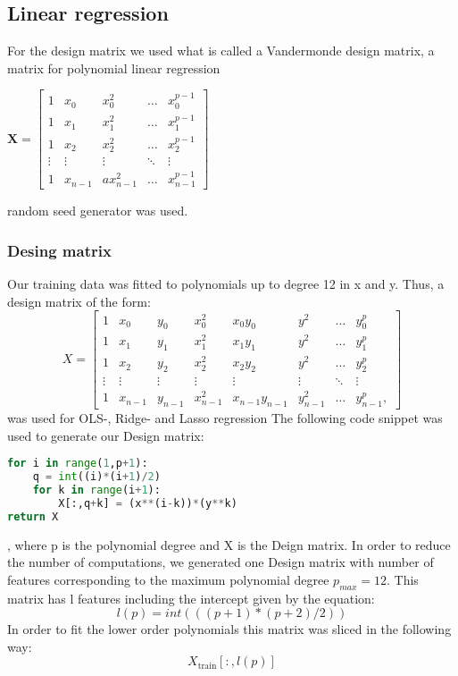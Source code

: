 \subsection{Linear regression}
For the design matrix we used what is called a Vandermonde design matrix, a matrix for polynomial linear regression
\begin{center}
$\boldsymbol{X}=
\begin{bmatrix} 
1 & x_{0}&x_{0}^{2}&\dots &x_{0}^{p-1}
\\1&x_{1}&x_{1}^{2}&\dots &x_{1}^{p-1}
\\1&x_{2}&x_{2}^{2}&\dots &x_{2}^{p-1}
\\ \vdots &\vdots &\vdots &\ddots &\vdots \\
1&x_{n-1}&ax_{n-1}^{2}&\dots &x_{n-1}^{p-1}
\end{bmatrix}
$
\end{center}

random seed generator was used. 

\subsubsection{Desing matrix}

Our training data was fitted to polynomials up
to degree 12 in x and y. Thus, a design matrix of the form:
\begin{equation*}
    X = 
    \begin{bmatrix}

        1 & x_{0} & y_0 & x_{0}^{2} & x_0 y_0 & y^2 & \dots &y_{0}^{p} \\
        1 & x_{1} & y_1 & x_{1}^{2} & x_1 y_1 & y^2 & \dots &y_{1}^{p} \\
        1 & x_{2} & y_2 & x_{2}^{2} & x_2 y_2 & y^2 & \dots &y_{2}^{p} \\
        \vdots &\vdots &\vdots &\vdots &\vdots & \vdots & \ddots & \vdots \\
        1&x_{n-1} & y_{n-1} & x_{n-1}^2 & x_{n-1} y_{n-1} & y_{n-1}^2 & \dots &y_{n-1}^{p}, 
    \end{bmatrix}
\end{equation*}
was used for OLS-, Ridge- and Lasso regression
The following code snippet was used to generate our Design matrix: 
\begin{lstlisting}[language=Python]
for i in range(1,p+1):
    q = int((i)*(i+1)/2)
    for k in range(i+1):
        X[:,q+k] = (x**(i-k))*(y**k)
return X
\end{lstlisting}
, where p is the polynomial degree and X is the Deign matrix. 
In order to reduce the number of computations, we generated one Design matrix
with number of features corresponding to the maximum polynomial degree $p_{max}
= 12$. This matrix has l features including the intercept given by the
equation: 
\begin{equation*}
        l(p) = int(((p+1)*(p+2)/2))		
\end{equation*}
In order to fit the lower order polynomials this matrix was sliced in the
following way:
\begin{equation*}
    X_{\text{train}}[:,l(p)] 
\end{equation*}

